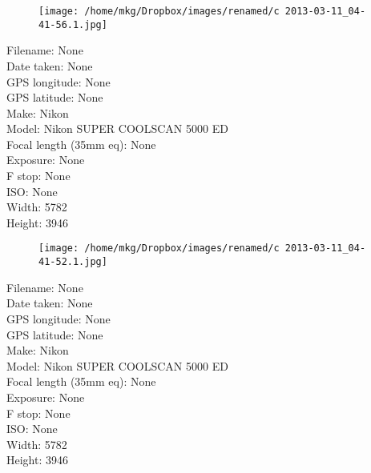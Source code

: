 \clearpage
\recalctypearea
\newpage
\noindent
\begin{figure}
    \texttt{[image: /home/mkg/Dropbox/images/renamed/c 2013-03-11\_04-41-56.1.jpg]}
\end{figure}

\clearpage
\recalctypearea
\newpage
\noindent
Filename: None\\ 
Date taken: None\\ 
GPS longitude: None\\ 
GPS latitude: None\\ 
Make: Nikon\\ 
Model: Nikon SUPER COOLSCAN 5000 ED\\ 
Focal length (35mm eq): None\\ 
Exposure: None\\ 
F stop: None\\ 
ISO: None\\ 
Width: 5782\\ 
Height: 3946\\ 

\clearpage
\recalctypearea
\newpage
\noindent
\begin{figure}
    \texttt{[image: /home/mkg/Dropbox/images/renamed/c 2013-03-11\_04-41-52.1.jpg]}
\end{figure}

\clearpage
\recalctypearea
\newpage
\noindent
Filename: None\\ 
Date taken: None\\ 
GPS longitude: None\\ 
GPS latitude: None\\ 
Make: Nikon\\ 
Model: Nikon SUPER COOLSCAN 5000 ED\\ 
Focal length (35mm eq): None\\ 
Exposure: None\\ 
F stop: None\\ 
ISO: None\\ 
Width: 5782\\ 
Height: 3946\\ 

